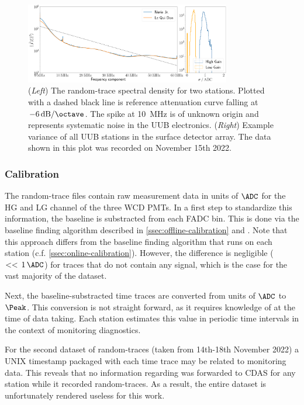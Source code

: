 \begin{figure}
	\centering
	\includegraphics[width=0.8\textwidth]{./plots/fft_variance_plot_combined.png}
	\caption{(\textit{Left}) The random-trace spectral density for two stations. Plotted with a dashed black line is reference attenuation curve falling at 
	$\SI[per-mode=symbol]{-6}{\deci\bel\per\octave}$. The spike at \SI{10}{\mega\hertz} is of unknown origin and represents systematic noise in the UUB 
	electronics. (\textit{Right}) Example variance of all UUB stations in the surface detector array. The data shown in this plot was recorded on November 15th 
    2022.}
	\label{fig:random-traces}
\end{figure}

\subsubsection{Calibration}
\label{ssec:random-trace-calibration}

The random-trace files contain raw measurement data in units of $\SI{}{\ADC}$ for the HG and LG channel of the three WCD PMTs. In a first step to standardize this
information, the baseline is substracted from each FADC bin. This is done via the baseline finding algorithm described in \autoref{ssec:offline-calibration} and 
\cite{tobiasBaseline, tobiasBaselineUUB}. Note that this approach differs from the baseline finding algorithm that runs on each station (c.f. 
\autoref{ssec:online-calibration}). However, the difference is negligible ($<<\,\SI{1}{\ADC}$) for traces that do not contain any signal, which is the case for the 
vast majority of the dataset.

Next, the baseline-substracted time traces are converted from units of $\SI{}{\ADC}$ to $\SI{}{\Peak}$. This conversion is not straight forward, as it requires 
knowledge of \Ipeak at the time of data taking. Each station estimates this value in periodic time intervals in the context of monitoring diagnostics.

For the second dataset of random-traces (taken from 14th-18th November 2022) a UNIX timestamp packaged with each time trace may be related to monitoring data. This 
reveals that no information regarding \Ipeak was forwarded to CDAS for any station while it recorded random-traces. As a result, the entire dataset is unfortunately 
rendered useless for this work.

